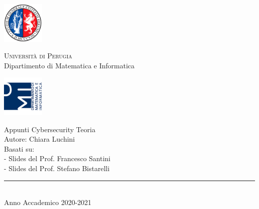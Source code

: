 
\thispagestyle{empty} %

	\noindent %
	\includegraphics[width=0.15\textwidth]{logoUniPg}
	\begin{minipage}[b]{0.7\textwidth}
		\centering
		{\Large \textcolor{blu_dmi}{\textsc{Universit{\`a} di Perugia}}}\\
		\vspace{0.4 em}
		{\large \textcolor{blu_dmi}{Dipartimento di Matematica e Informatica}}
		\vspace{0.6 em}
	\end{minipage}%
	\includegraphics[width=0.15\textwidth]{logoDMI}
	
	\vspace{8 em}

	\begin{center}
		

	
		{\Huge \textcolor{blu_dmi}{Appunti Cybersecurity Teoria}}\\
		\vspace{2 em}
		{\large \textcolor{blu_dmi}{ Autore: Chiara Luchini}}\\
		\vspace{5 em}
		{\large \textcolor{blu_dmi}{Basati su:}}\\
		{\large \textcolor{blu_dmi}{- Slides del Prof. Francesco Santini}}\\
		{\large \textcolor{blu_dmi}{- Slides del Prof. Stefano Bistarelli}}\\
		
	
	

		
		\vspace{6 em}
		\vfill
		
		\textcolor{blu_dmi}{\rule{380pt}{.4pt}}\\
		\vspace{1.2 em}
		\large{\textcolor{blu_dmi}{Anno Accademico 2020-2021}}
		
		
		
		
	\end{center}

